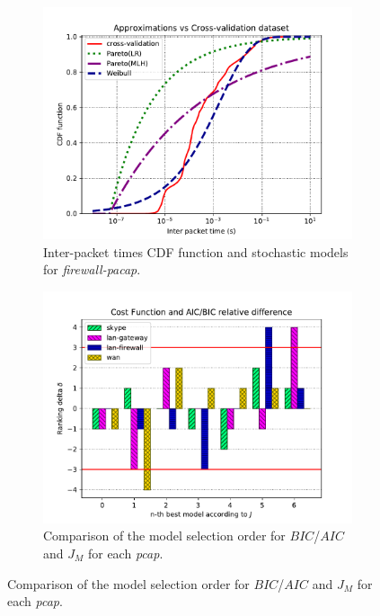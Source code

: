 \begin{figure}[!ht]
\begin{figure}[H]
\centering
\includegraphics[scale=0.7]{figures/ch4/cdfs}
\caption{Inter-packet times CDF function and stochastic models for \textit{firewall-pacap}.}
\label{fig:lan-firewall-cdf}
\end{figure}
\begin{figure}[H]
\centering
\includegraphics[scale=0.75]{figures/ch4/aicbic-costfunction-relative-diff}
\caption{Comparison of the model selection order for $BIC$/$AIC$ and  $J_M$ for each \textit{pcap}.}
\label{fig:cost-function_vs_aic-bic}
\end{figure}
\end{figure}


